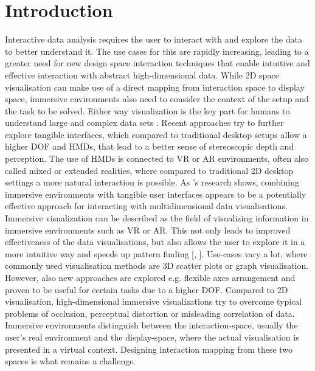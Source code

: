 

\section{Introduction}
\label{section:Introduction}
Interactive data analysis requires the user to interact with and explore the data to better understand it. The use cases for this are rapidly increasing, leading to a greater need for new design space interaction techniques that enable intuitive and effective interaction with abstract high-dimensional data. While 2D space visualisation can make use of a direct mapping from interaction space to display space, immersive environments also need to consider the context of the setup and the task to be solved. Either way visualization is the key part for humans to understand large and complex data sets \autocite[]{Donalek2015}. \newline
Recent approaches try to further explore tangible interfaces, which compared to traditional desktop setups allow a higher \ac{DOF} \autocite{Bach2018} \autocite[]{Besancon2017} and \ac{HMD}s, that lead to a better sense of stereoscopic depth and perception. The use of \ac{HMD}s is connected to \ac{VR} or \ac{AR} environments, often also called mixed or extended realities, where compared to traditional 2D desktop settings a more natural interaction is possible. As \cite{Bach2018}'s research shows, combining immersive environments with tangible user interfaces appears to be a potentially effective approach for interacting with multidimensional data visualisations.\newline
Immersive visualization can be described as the field of visualizing information in immersive environments such as \ac{VR} or \ac{AR}. This not only leads to improved effectiveness of the data visualisations, but also allows the user to explore it in a more intuitive way and speeds up pattern finding [\autocite[3]{Butscher2018}, \autocite[489]{WagnerFilho2018}]. Use-cases vary a lot, where commonly used visualisation methods are 3D scatter plots or graph visualisation. However, also new approaches are explored e.g. flexible axes arrangement \autocite[]{Cordeil2017a} and proven to be useful for certain tasks due to a higher \ac{DOF}.\newline
Compared to 2D visualisation, high-dimensional immersive visualizations try to overcome typical problems of occlusion, perceptual distortion or misleading correlation of data. Immersive environments distinguish between the interaction-space, usually the user's real environment and the display-space, where the actual visualisation is presented in a virtual context. Designing interaction mapping from these two spaces is what remains a challenge.\newline
